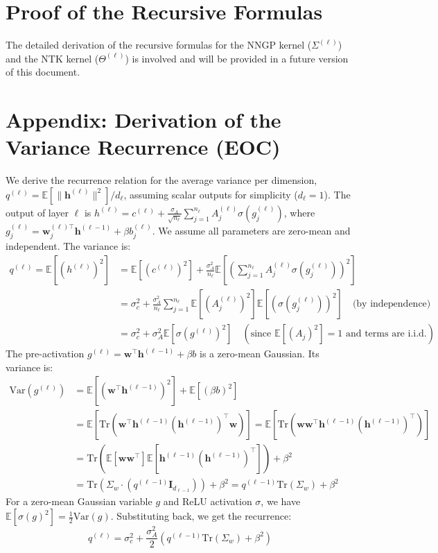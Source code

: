 \documentclass[a4paper]{article}
\begin{document}
\section{Proof of the Recursive Formulas}
The detailed derivation of the recursive formulas for the NNGP kernel ($\Sigma^{(\ell)}$) and the NTK kernel ($\Theta^{(\ell)}$) is involved and will be provided in a future version of this document.

\appendix
\section{Appendix: Derivation of the Variance Recurrence (EOC)}
We derive the recurrence relation for the average variance per dimension, $q^{(\ell)} = \mathbb{E}[\|\bm{h}^{(\ell)}\|^2]/d_\ell$, assuming scalar outputs for simplicity ($d_\ell=1$).
The output of layer $\ell$ is $h^{(\ell)} = c^{(\ell)} + \frac{\sigma_A}{\sqrt{n_\ell}} \sum_{j=1}^{n_\ell} A_j^{(\ell)} \sigma(g_j^{(\ell)})$, where $g_j^{(\ell)} = \bm{w}_j^{(\ell)\top} \bm{h}^{(\ell-1)} + \beta b_j^{(\ell)}$.
We assume all parameters are zero-mean and independent. The variance is:
\begin{align*}
    q^{(\ell)} = \mathbb{E}[(h^{(\ell)})^2] &= \mathbb{E}[(c^{(\ell)})^2] + \frac{\sigma_A^2}{n_\ell} \mathbb{E}\left[ \left( \sum_{j=1}^{n_\ell} A_j^{(\ell)} \sigma(g_j^{(\ell)}) \right)^2 \right] \\
    &= \sigma_c^2 + \frac{\sigma_A^2}{n_\ell} \sum_{j=1}^{n_\ell} \mathbb{E}[(A_j^{(\ell)})^2] \mathbb{E}[(\sigma(g_j^{(\ell)}))^2] \quad \text{(by independence)} \\
    &= \sigma_c^2 + \sigma_A^2 \mathbb{E}[\sigma(g^{(\ell)})^2] \quad (\text{since } \mathbb{E}[(A_j)^2]=1 \text{ and terms are i.i.d.})
\end{align*}
The pre-activation $g^{(\ell)} = \bm{w}^\top \bm{h}^{(\ell-1)} + \beta b$ is a zero-mean Gaussian. Its variance is:
\begin{align*}
    \text{Var}(g^{(\ell)}) &= \mathbb{E}[(\bm{w}^\top \bm{h}^{(\ell-1)})^2] + \mathbb{E}[(\beta b)^2] \\
    &= \mathbb{E}[\text{Tr}(\bm{w}^\top \bm{h}^{(\ell-1)} (\bm{h}^{(\ell-1)})^\top \bm{w})] = \mathbb{E}[\text{Tr}(\bm{w}\bm{w}^\top \bm{h}^{(\ell-1)}(\bm{h}^{(\ell-1)})^\top)] \\
    &= \text{Tr}(\mathbb{E}[\bm{w}\bm{w}^\top] \mathbb{E}[\bm{h}^{(\ell-1)}(\bm{h}^{(\ell-1)})^\top]) + \beta^2 \\
    &= \text{Tr}(\Sigma_w \cdot (q^{(\ell-1)} \mathbf{I}_{d_{\ell-1}})) + \beta^2 = q^{(\ell-1)}\text{Tr}(\Sigma_w) + \beta^2
\end{align*}
For a zero-mean Gaussian variable $g$ and ReLU activation $\sigma$, we have $\mathbb{E}[\sigma(g)^2] = \frac{1}{2}\text{Var}(g)$.
Substituting back, we get the recurrence:
\[ q^{(\ell)} = \sigma_c^2 + \frac{\sigma_A^2}{2} \left( q^{(\ell-1)}\text{Tr}(\Sigma_w) + \beta^2 \right) \]
\end{document}
